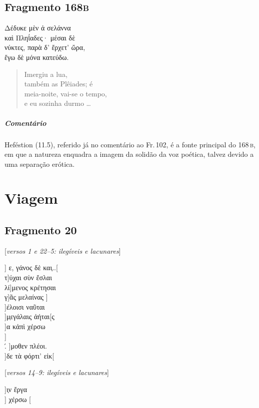 \pagebreak
\section{Fragmento 168\textsc{b}}

\begin{gkverse}
Δέδυκε μὲν ἀ σελάννα\\
καὶ Πληΐαδες· μέσαι δὲ\\
νύκτες, παρὰ δ’ ἔρχετ’ ὤρα,\\
ἔγω δὲ μόνα κατεύδω.
\end{gkverse}

\begin{verse}
Imergiu a lua,\\
também as Plêiades; é\\
meia-noite, vai-se o tempo,\\
e eu sozinha durmo \ldots{}
\end{verse}

\medskip

{\paragraph{Comentário} Heféstion (11.5), referido já no comentário ao Fr.\,102, é a fonte principal do 168\,\textsc{b}, em que a natureza enquadra a imagem da solidão da voz poética, talvez devido a uma separação erótica.}


\chapter{Viagem}

\section{Fragmento 20}

\begin{gkverse}
\textnormal{[\textit{versos 1 e 22--5: ilegíveis e lacunares}]}

] ε, γάνος δὲ και̣..[\\
τ]ύχαι σὺν ἔσλαι\\
         λί]μενος κρέτησαι\\
  γ]ᾶς μελαίνας
    ]\\
    ]έλοισι ναῦται\\
  ]μ̣εγάλαις ἀήται[ς\\
  ]α κἀπὶ χέρσω\\
    ]\\
  .́ ]μοθεν πλέοι.\\
  ]δε τὰ φόρτι’ εἰκ[

\textnormal{[\textit{versos 14--9: ilegíveis e lacunares}]}

]ι̣ν ἔργα\\
] χέρσω [
\end{gkverse}

